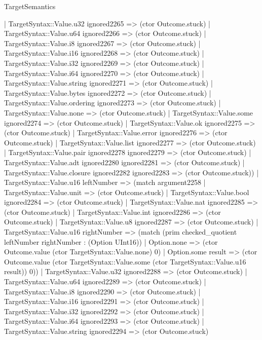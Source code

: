 \begin{lexlean}{TargetSemantics}
\begin{semanticmodule}
{              | TargetSyntax::Value.u32 ignored2265 => (ctor Outcome.stuck)
              | TargetSyntax::Value.u64 ignored2266 => (ctor Outcome.stuck)
              | TargetSyntax::Value.i8 ignored2267 => (ctor Outcome.stuck)
              | TargetSyntax::Value.i16 ignored2268 => (ctor Outcome.stuck)
              | TargetSyntax::Value.i32 ignored2269 => (ctor Outcome.stuck)
              | TargetSyntax::Value.i64 ignored2270 => (ctor Outcome.stuck)
              | TargetSyntax::Value.string ignored2271 => (ctor Outcome.stuck)
              | TargetSyntax::Value.bytes ignored2272 => (ctor Outcome.stuck)
              | TargetSyntax::Value.ordering ignored2273 => (ctor Outcome.stuck)
              | TargetSyntax::Value.none => (ctor Outcome.stuck)
              | TargetSyntax::Value.some ignored2274 => (ctor Outcome.stuck)
              | TargetSyntax::Value.ok ignored2275 => (ctor Outcome.stuck)
              | TargetSyntax::Value.error ignored2276 => (ctor Outcome.stuck)
              | TargetSyntax::Value.list ignored2277 => (ctor Outcome.stuck)
              | TargetSyntax::Value.pair ignored2278 ignored2279 => (ctor Outcome.stuck)
              | TargetSyntax::Value.adt ignored2280 ignored2281 => (ctor Outcome.stuck)
              | TargetSyntax::Value.closure ignored2282 ignored2283 => (ctor Outcome.stuck))
            | TargetSyntax::Value.u16 leftNumber => (match argument2258
              | TargetSyntax::Value.unit => (ctor Outcome.stuck)
              | TargetSyntax::Value.bool ignored2284 => (ctor Outcome.stuck)
              | TargetSyntax::Value.nat ignored2285 => (ctor Outcome.stuck)
              | TargetSyntax::Value.int ignored2286 => (ctor Outcome.stuck)
              | TargetSyntax::Value.u8 ignored2287 => (ctor Outcome.stuck)
              | TargetSyntax::Value.u16 rightNumber => (match (prim checked_quotient leftNumber rightNumber : (Option UInt16))
                | Option.none => (ctor Outcome.value (ctor TargetSyntax::Value.none) 0)
                | Option.some result => (ctor Outcome.value (ctor TargetSyntax::Value.some (ctor TargetSyntax::Value.u16 result)) 0))
              | TargetSyntax::Value.u32 ignored2288 => (ctor Outcome.stuck)
              | TargetSyntax::Value.u64 ignored2289 => (ctor Outcome.stuck)
              | TargetSyntax::Value.i8 ignored2290 => (ctor Outcome.stuck)
              | TargetSyntax::Value.i16 ignored2291 => (ctor Outcome.stuck)
              | TargetSyntax::Value.i32 ignored2292 => (ctor Outcome.stuck)
              | TargetSyntax::Value.i64 ignored2293 => (ctor Outcome.stuck)
              | TargetSyntax::Value.string ignored2294 => (ctor Outcome.stuck)
}
\end{semanticmodule}
\end{lexlean}
